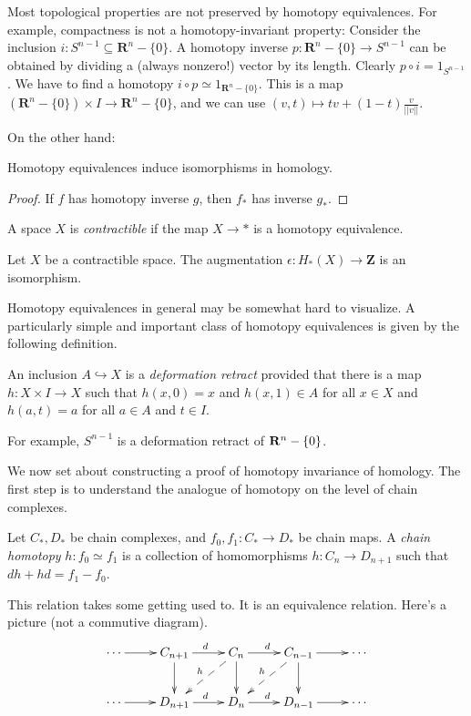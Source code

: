 Most topological properties are not preserved by homotopy equivalences.
For example, compactness is not a homotopy-invariant property: Consider the inclusion $i:S^{n-1}\subseteq \mathbf{R}^n-\{0\}$. A homotopy inverse $p:\mathbf{R}^n-\{0\}\to S^{n-1}$ can be obtained by dividing a (always nonzero!) vector by its length. Clearly $p\circ i=1_{S^{n-1}}$. We have to find a homotopy $i\circ p\simeq1_{\mathbf{R}^n-\{0\}}$. This is a map $(\mathbf{R}^n-\{0\})\times I\to \mathbf{R}^n-\{0\}$, and we can use $(v,t)\mapsto tv+(1-t)\frac{v}{||v||}$.

On the other hand:
\begin{corollary}
Homotopy equivalences induce isomorphisms in homology.
\end{corollary}
\begin{proof} 
If $f$ has homotopy inverse $g$, then $f_*$ has inverse $g_*$.
\end{proof}
\begin{definition}
A space $X$ is {\em contractible} if the map $X\to\ast$ is a homotopy equivalence.
\end{definition}
\begin{corollary}
Let $X$ be a contractible space. The augmentation $\epsilon:H_*(X)\to\mathbf{Z}$ is an isomorphism. 
\end{corollary}

Homotopy equivalences in general may be somewhat hard to visualize. 
A particularly simple and important class of homotopy equivalences is 
given by the following definition. 
\begin{definition}
An inclusion $A\hookrightarrow X$ is a {\em deformation retract} 
provided that there is a map $h:X\times I\to X$ such that 
$h(x,0)=x$ and $h(x,1)\in A$ for all $x\in X$ and $h(a,t)=a$ for all
$a\in A$ and $t\in I$. 
\end{definition}

For example, $S^{n-1}$ is a deformation retract of $\mathbf R^n-\{0\}$.

\bigskip
We now set about constructing a proof of homotopy invariance of homology. 
The first step is to understand the analogue of homotopy on the level of
chain complexes. 
	\begin{definition}
	Let $C_\ast,D_\ast$ be chain complexes, and $f_0,f_1:C_\ast\to D_\ast$ be chain maps. A {\em chain homotopy} $h:f_0\simeq f_1$ is a collection of homomorphisms $h:C_n\to D_{n+1}$ such that $dh+hd=f_1-f_0$.
	\end{definition}
This relation takes some getting used to. It is an equivalence relation.
Here's a picture (not a commutive diagram).
\begin{equation*}\xymatrix{
\cdots \ar[r] & 
C_{n+1}\ar[d]\ar[r]^d & C_n\ar@{-->}[dl]_h\ar[d]\ar[r]^d &
C_{n-1}\ar@{-->}[dl]_h\ar[d]\ar[r] & \cdots \\
\cdots \ar[r] & D_{n+1}\ar[r]^d & D_n \ar[r]^d & D_{n-1}\ar[r] & \cdots
}\end{equation*}

